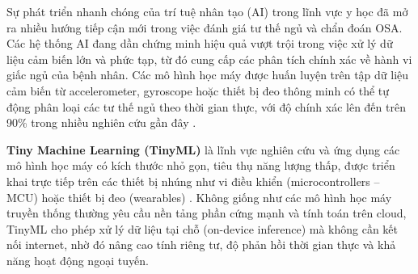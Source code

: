 Sự phát triển nhanh chóng của trí tuệ nhân tạo (AI) trong lĩnh vực y học đã mở
ra nhiều hướng tiếp cận mới trong việc đánh giá tư thế ngủ và chẩn đoán OSA.
Các hệ thống AI đang dần chứng minh hiệu quả vượt trội trong việc xử lý dữ liệu
cảm biến lớn và phức tạp, từ đó cung cấp các phân tích chính xác về hành vi
giấc ngủ của bệnh nhân. Các mô hình học máy được huấn luyện trên tập dữ liệu
cảm biến từ accelerometer, gyroscope hoặc thiết bị đeo thông minh có thể tự
động phân loại các tư thế ngủ theo thời gian thực, với độ chính xác lên đến
trên 90\% trong nhiều nghiên cứu gần đây
\cite{Sleep_Posture_Detection}\cite{Vu2025SleepPosition}\cite{HOANG2025116309}.

\textbf{Tiny Machine Learning (TinyML)} là lĩnh vực nghiên cứu và ứng dụng các
mô hình học máy có kích thước nhỏ gọn, tiêu thụ năng lượng thấp,
được triển khai trực tiếp trên các thiết bị nhúng như vi điều khiển
(microcontrollers – MCU) hoặc thiết bị đeo (wearables) \cite{ray2021tinyml}.
Không giống như các mô hình học máy truyền thống thường yêu cầu nền
tảng phần cứng mạnh và tính toán trên cloud, TinyML cho phép xử lý dữ
liệu tại chỗ (on-device inference) mà không cần kết nối internet,
nhờ đó nâng cao tính riêng tư, độ phản hồi thời gian thực và khả năng
hoạt động ngoại tuyến.

